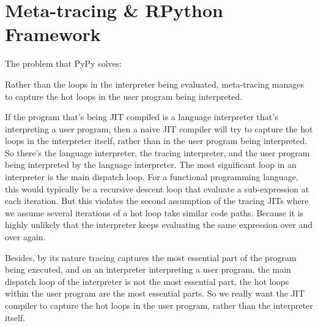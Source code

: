 

    \section{Meta-tracing \& RPython Framework}
        \begin{mainpoint}
            The problem that PyPy solves:

            Rather than the loops in the interpreter being evaluated, meta-tracing manages to capture the hot loops in the user program being interpreted.
        \end{mainpoint}

        \begin{paragraph-here}
            If the program that's being JIT compiled is a language interpreter that's interpreting a user program, then a naive JIT compiler will try to capture the hot loops in the interpreter itself, rather than in the user program being interpreted.
            So there's the language interpreter, the tracing interpreter, and the user program being interpreted by the language interpreter.
            The most significant loop in an interpreter is the main dispatch loop. For a functional programming language, this would typically be a recursive descent loop that evaluate a sub-expression at each iteration. But this violates the second assumption of the tracing JITs where we assume several iterations of a hot loop take similar code paths. Because it is highly unlikely that the interpreter keeps evaluating the same expression over and over again.
        \end{paragraph-here}

        \begin{paragraph-here}
            Besides, by its nature tracing captures the most essential part of the program being executed, and on an interpreter interpreting a user program, the main dispatch loop of the interpreter is not the most essential part, the hot loops within the user program are the most essential parts. So we really want the JIT compiler to capture the hot loops in the user program, rather than the interpreter itself.
        \end{paragraph-here}

